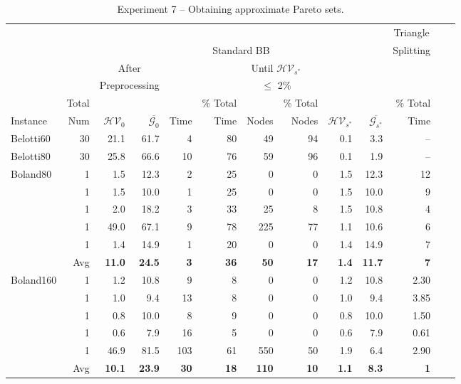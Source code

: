 \documentclass[11.5pt]{article}
\begin{document}
 \begin{table}[h!]
\centering
\caption{Experiment 7 -- Obtaining approximate Pareto sets.}\label{table_appx}
\begin{tabular}{l|r|rr|rrrrrr|rrr}
\toprule
 &  & \multicolumn{8}{c}{} & \multicolumn{1}{c}{Triangle}\\
 &  & \multicolumn{8}{c}{Standard BB} & \multicolumn{1}{c}{Splitting}\\
 \cmidrule(r){3-10}
\cmidrule(r){11-11}
  &  & \multicolumn{2}{c}{After} & \multicolumn{6}{c}{Until $\mathcal{HV}_{s^*}$} & \\
  &  & \multicolumn{2}{c}{Preprocessing} & \multicolumn{6}{c}{$\leq$ 2\%} & \\
\cmidrule(r){3-4}
\cmidrule(r){5-10}
 & Total &  & &  & \% Total &  & \% Total &  &  &  \% Total \\ 
Instance & Num & $\mathcal{HV}_0$ & $\overline{\mathcal{G}_{0}}$ & Time & Time & Nodes & Nodes & $\mathcal{HV}_{s^*}$ & $\overline{\mathcal{G}_{s^*}}$ &  Time \\ 
\midrule
Belotti60 & 30 & 21.1 & 61.7 & 4 & 80 & 49 & 94 & 0.1 & 3.3 & --\\
Belotti80 & 30 & 25.8 & 66.6 & 10 & 76 & 59 & 96 & 0.1 & 1.9 & --\\
\midrule
Boland80 & 1 & 1.5 & 12.3 & 2 & 25 & 0 & 0 & 1.5 & 12.3 & 12\\
         & 1 & 1.5 & 10.0 & 1 & 25 & 0 & 0 & 1.5 & 10.0 & 9\\
         & 1 & 2.0 & 18.2 & 3 & 33 & 25 & 8 & 1.5 & 10.8 & 4\\
         & 1 & 49.0 & 67.1 & 9 & 78 & 225 & 77 & 1.1 & 10.6 & 6\\
         & 1 & 1.4 & 14.9 & 1 & 20 & 0 & 0 & 1.4 & 14.9 & 7\\
\cmidrule(r){3-11}
         & Avg & \bf 11.0 & \bf 24.5 & \bf 3 & \bf 36 & \bf 50 & \bf 17 & \bf 1.4 & \bf 11.7 & \bf 7\\
\cmidrule(r){3-11}
Boland160 & 1 & 1.2 & 10.8 & 9 & 8 & 0 & 0 & 1.2 & 10.8 & 2.30\\
         & 1 & 1.0 & 9.4 & 13 & 8 & 0 & 0 & 1.0 & 9.4 & 3.85\\
         & 1 & 0.8 & 10.0 & 8 & 9 & 0 & 0 & 0.8 & 10.0 & 1.50\\
         & 1 & 0.6 & 7.9 & 16 & 5 & 0 & 0 & 0.6 & 7.9 & 0.61\\
         & 1 & 46.9 & 81.5 & 103 & 61 & 550 & 50 & 1.9 & 6.4 & 2.90\\
\cmidrule(r){3-11}
         & Avg & \bf 10.1 & \bf 23.9 & \bf 30 & \bf 18 & \bf 110 & \bf 10 & \bf 1.1 & \bf 8.3 & \bf 1\\

\end{tabular}
\end{table}
\end{document}
